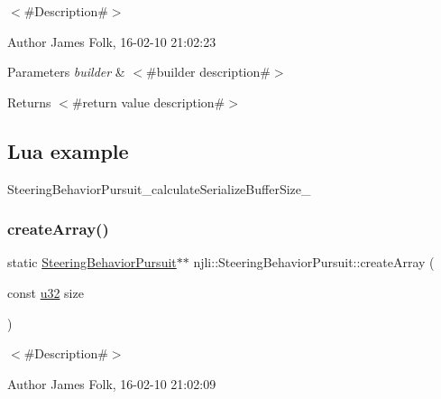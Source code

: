 $<$\#\+Description\#$>$ 

\begin{DoxyAuthor}{Author}
James Folk, 16-\/02-\/10 21\+:02\+:23
\end{DoxyAuthor}

\begin{DoxyParams}{Parameters}
{\em builder} & $<$\#builder description\#$>$\\
\hline
\end{DoxyParams}
\begin{DoxyReturn}{Returns}
$<$\#return value description\#$>$
\end{DoxyReturn}
\hypertarget{classnjli_1_1_steering_behavior_wander_ex1}{}\subsection{Lua example}\label{classnjli_1_1_steering_behavior_wander_ex1}

\begin{DoxyCodeInclude}
\end{DoxyCodeInclude}
Steering\+Behavior\+Pursuit\+\_\+calculate\+Serialize\+Buffer\+Size\+\_\+ \mbox{\label{classnjli_1_1_steering_behavior_pursuit_a7778636233f52befa9417ffea537535a}} 
\subsubsection{\texorpdfstring{create\+Array()}{createArray()}}
{\footnotesize\ttfamily static \mbox{\hyperlink{classnjli_1_1_steering_behavior_pursuit}{Steering\+Behavior\+Pursuit}}$\ast$$\ast$ njli\+::\+Steering\+Behavior\+Pursuit\+::create\+Array (\begin{DoxyParamCaption}\item[{const \mbox{\hyperlink{_util_8h_a10e94b422ef0c20dcdec20d31a1f5049}{u32}}}]{size }\end{DoxyParamCaption})\hspace{0.3cm}{\ttfamily [static]}}



$<$\#\+Description\#$>$ 

\begin{DoxyAuthor}{Author}
James Folk, 16-\/02-\/10 21\+:02\+:09
\end{DoxyAuthor}

